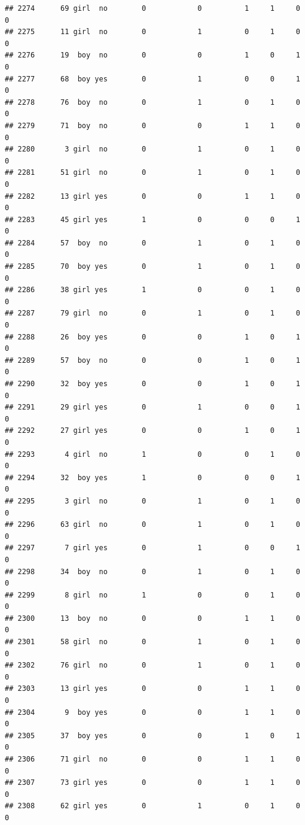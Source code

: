 \documentclass[man]{apa6}
\begin{document}
\begin{verbatim}
## 2274      69 girl  no        0            0          1     1     0     0
## 2275      11 girl  no        0            1          0     1     0     0
## 2276      19  boy  no        0            0          1     0     1     0
## 2277      68  boy yes        0            1          0     0     1     0
## 2278      76  boy  no        0            1          0     1     0     0
## 2279      71  boy  no        0            0          1     1     0     0
## 2280       3 girl  no        0            1          0     1     0     0
## 2281      51 girl  no        0            1          0     1     0     0
## 2282      13 girl yes        0            0          1     1     0     0
## 2283      45 girl yes        1            0          0     0     1     0
## 2284      57  boy  no        0            1          0     1     0     0
## 2285      70  boy yes        0            1          0     1     0     0
## 2286      38 girl yes        1            0          0     1     0     0
## 2287      79 girl  no        0            1          0     1     0     0
## 2288      26  boy yes        0            0          1     0     1     0
## 2289      57  boy  no        0            0          1     0     1     0
## 2290      32  boy yes        0            0          1     0     1     0
## 2291      29 girl yes        0            1          0     0     1     0
## 2292      27 girl yes        0            0          1     0     1     0
## 2293       4 girl  no        1            0          0     1     0     0
## 2294      32  boy yes        1            0          0     0     1     0
## 2295       3 girl  no        0            1          0     1     0     0
## 2296      63 girl  no        0            1          0     1     0     0
## 2297       7 girl yes        0            1          0     0     1     0
## 2298      34  boy  no        0            1          0     1     0     0
## 2299       8 girl  no        1            0          0     1     0     0
## 2300      13  boy  no        0            0          1     1     0     0
## 2301      58 girl  no        0            1          0     1     0     0
## 2302      76 girl  no        0            1          0     1     0     0
## 2303      13 girl yes        0            0          1     1     0     0
## 2304       9  boy yes        0            0          1     1     0     0
## 2305      37  boy yes        0            0          1     0     1     0
## 2306      71 girl  no        0            0          1     1     0     0
## 2307      73 girl yes        0            0          1     1     0     0
## 2308      62 girl yes        0            1          0     1     0     0

\end{verbatim}
\end{document}
